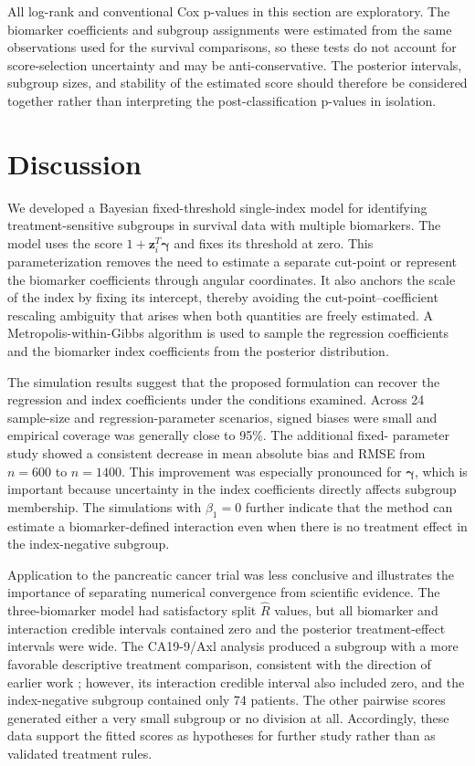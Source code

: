 All log-rank and conventional Cox p-values in this section are exploratory.
The biomarker coefficients and subgroup assignments were estimated from the
same observations used for the survival comparisons, so these tests do not
account for score-selection uncertainty and may be anti-conservative. The
posterior intervals, subgroup sizes, and stability of the estimated score
should therefore be considered together rather than interpreting the
post-classification p-values in isolation.

\section{Discussion}

We developed a Bayesian fixed-threshold single-index model for identifying
treatment-sensitive subgroups in survival data with multiple biomarkers. The
model uses the score $1+\mathbf{z}_i^{T}\boldsymbol\gamma$ and fixes its
threshold at zero. This parameterization removes the need to estimate a
separate cut-point or represent the biomarker coefficients through angular
coordinates. It also anchors the scale of the index by fixing its intercept,
thereby avoiding the cut-point--coefficient rescaling ambiguity that arises
when both quantities are freely estimated. A Metropolis-within-Gibbs
algorithm is used to sample the regression coefficients and the biomarker
index coefficients from the posterior distribution.

The simulation results suggest that the proposed formulation can recover the
regression and index coefficients under the conditions examined. Across 24
sample-size and regression-parameter scenarios, signed biases were small and
empirical coverage was generally close to 95\%. The additional fixed-
parameter study showed a consistent decrease in mean absolute bias and RMSE
from $n=600$ to $n=1400$. This improvement was especially pronounced for
$\boldsymbol\gamma$, which is important because uncertainty in the index
coefficients directly affects subgroup membership. The simulations with
$\beta_1=0$ further indicate that the method can estimate a biomarker-defined
interaction even when there is no treatment effect in the index-negative
subgroup.

Application to the pancreatic cancer trial was less conclusive and
illustrates the importance of separating numerical convergence from
scientific evidence. The three-biomarker model had satisfactory split
$\widehat R$ values, but all biomarker and interaction credible intervals
contained zero and the posterior treatment-effect intervals were wide. The
CA19-9/Axl analysis produced a subgroup with a more favorable descriptive
treatment comparison, consistent with the direction of earlier work
\cite{HeYe2018AstC}; however, its interaction credible interval also included
zero, and the index-negative subgroup contained only 74 patients. The other
pairwise scores generated either a very small subgroup or no division at all.
Accordingly, these data support the fitted scores as hypotheses for further
study rather than as validated treatment rules.

